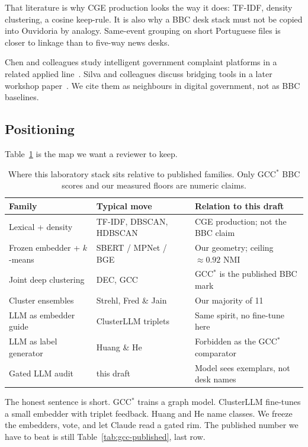 \documentclass[11pt,a4paper]{article}
\begin{document}
That literature is why CGE production looks the way it does:
TF-IDF, density clustering, a cosine keep-rule. It is also why
a BBC desk stack must not be copied into Ouvidoria by analogy.
Same-event grouping on short Portuguese files is closer to
linkage than to five-way news desks.

Chen and colleagues study intelligent government complaint
platforms in a related applied line~\cite{chen2022igcp}. Silva
and colleagues discuss bridging tools in a later workshop
paper~\cite{silva2026bridging}. We cite them as neighbours in
digital government, not as BBC baselines.

\subsection{Positioning}

Table~\ref{tab:sota-map} is the map we want a reviewer to keep.

\begin{table}[t]
\centering
\caption{Where this laboratory stack sits relative to published
families. Only GCC$^*$ BBC scores and our measured floors are
numeric claims.}
\label{tab:sota-map}
\small
\begin{tabular}{>{\raggedright\arraybackslash}p{}
                >{\raggedright\arraybackslash}p{}
                >{\raggedright\arraybackslash}p{}}
\toprule
Family & Typical move & Relation to this draft \\
\midrule
Lexical + density
  & TF-IDF, DBSCAN, HDBSCAN
  & CGE production; not the BBC claim \\
Frozen embedder + $k$-means
  & SBERT / MPNet / BGE
  & Our geometry; ceiling $\approx 0.92$ NMI \\
Joint deep clustering
  & DEC, GCC
  & GCC$^*$ is the published BBC mark \\
Cluster ensembles
  & Strehl, Fred \& Jain
  & Our majority of 11 \\
LLM as embedder guide
  & ClusterLLM triplets
  & Same spirit, no fine-tune here \\
LLM as label generator
  & Huang \& He
  & Forbidden as the GCC$^*$ comparator \\
Gated LLM audit
  & this draft
  & Model sees exemplars, not desk names \\
\bottomrule
\end{tabular}
\end{table}

The honest sentence is short. GCC$^*$ trains a graph model.
ClusterLLM fine-tunes a small embedder with triplet feedback.
Huang and He name classes. We freeze the embedders, vote, and
let Claude read a gated rim. The published number we have to
beat is still Table~\ref{tab:gcc-published}, last row.
\end{document}
